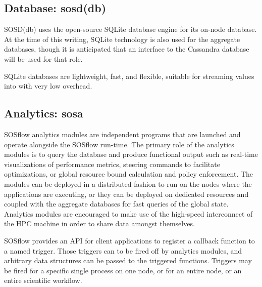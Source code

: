 \subsection{Database: sosd(db)} %
%
SOSD(db) uses the open-source SQLite database engine for its on-node
database.
%
At the time of this writing, SQLite technology is also used for the
aggregate databases, though it is anticipated that an interface to the
Cassandra database will be used for that role.
%
\par
%
SQLite databases are lightweight, fast, and flexible, suitable for
streaming values into with very low overhead.


\subsection{Analytics: sosa} %
%
SOSflow analytics modules are independent programs that are launched
and operate alongside the SOSflow run-time.
%
The primary role of the analytics modules is to query the database
and produce functional output such as real-time visualizations of
performance metrics, steering commands to facilitate optimizations, or
global resource bound calculation and policy enforcement.
%
The modules can be deployed in a distributed fashion to run on the nodes
where the applications are executing, or they can be deployed on dedicated
resources and coupled with the aggregate databases for fast queries
of the global state.
%
Analytics modules are encouraged to make use of the high-speed
interconnect of the HPC machine in order to share data amongst themselves.
%
\par
%
SOSflow provides an API for client applications to register
a callback function to a named trigger.
%
Those triggers can to be fired off by analytics modules, and arbitrary
data structures can be passed to the triggered functions.
%
Triggers may be fired for a specific single process on one node,
or for an entire node, or an entire scientific workflow.



